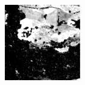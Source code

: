 \documentclass[usenames,dvipsnames,10pt]{beamer}
\begin{document}
\begin{frame}
\begin{minipage}[]{0.3\textwidth}
	\includegraphics[width=\textwidth]{graphics/tfcn-output-05.jpg}
\end{minipage}
\end{frame}
\end{document}
